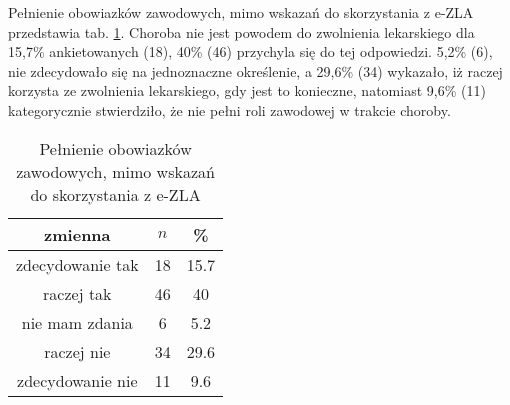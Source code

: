  Pełnienie obowiazków zawodowych, mimo wskazań do skorzystania z e-ZLA przedstawia tab. \ref{tab:Q32}. Choroba nie jest powodem do zwolnienia lekarskiego dla 15,7\% ankietowanych (18), 40\% (46) przychyla się do tej odpowiedzi. 5,2\% (6), nie zdecydowało się na jednoznaczne określenie, a 29,6\% (34) wykazało, iż raczej korzysta ze zwolnienia lekarskiego, gdy jest to konieczne, natomiast 9,6\% (11) kategorycznie stwierdziło, że nie pełni roli zawodowej w trakcie choroby.

\begin{table}[H]
\caption{Pełnienie obowiazków zawodowych, mimo wskazań do skorzystania z e-ZLA}
\centering
\begin{tabular}{ | c | c | c |}
\hline
zmienna & $n$ & \% \\
\hline
zdecydowanie tak  &  18  & 15.7 \\
\hline
raczej tak  &  46  & 40 \\
\hline
nie mam zdania  &  6  & 5.2 \\
\hline
raczej nie  &  34  & 29.6 \\
\hline
zdecydowanie nie  &  11  & 9.6 \\
\hline
\end{tabular}
\label{tab:Q32}
\end{table}
